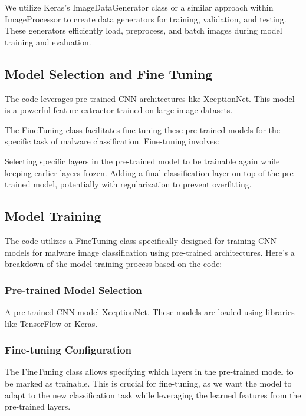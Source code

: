 \documentclass[conference]{IEEEtran}
\begin{document}
    We utilize Keras's ImageDataGenerator class or a similar approach within ImageProcessor to create data generators for training, validation, and testing. These generators efficiently load, preprocess, and batch images during model training and evaluation.

\subsection{Model Selection and Fine Tuning}

    The code leverages pre-trained CNN architectures like XceptionNet. This model is a  powerful feature extractor trained on large image datasets.
    
    The FineTuning class facilitates fine-tuning these pre-trained models for the specific task of malware classification. Fine-tuning involves: 

    Selecting specific layers in the pre-trained model to be trainable again while keeping earlier layers frozen.
    Adding a final classification layer on top of the pre-trained model, potentially with regularization to prevent overfitting.

\subsection{Model Training}
The code utilizes a FineTuning class specifically designed for training CNN models for malware image classification using pre-trained architectures. Here's a breakdown of the model training process based on the code:

\subsubsection{Pre-trained Model Selection}

    A pre-trained CNN model XceptionNet. These models are loaded using libraries like TensorFlow or Keras.

\subsubsection{Fine-tuning Configuration}

    The FineTuning class allows specifying which layers in the pre-trained model to be marked as trainable. This is crucial for fine-tuning, as we want the model to adapt to the new classification task while leveraging the learned features from the pre-trained layers.
\end{document}
